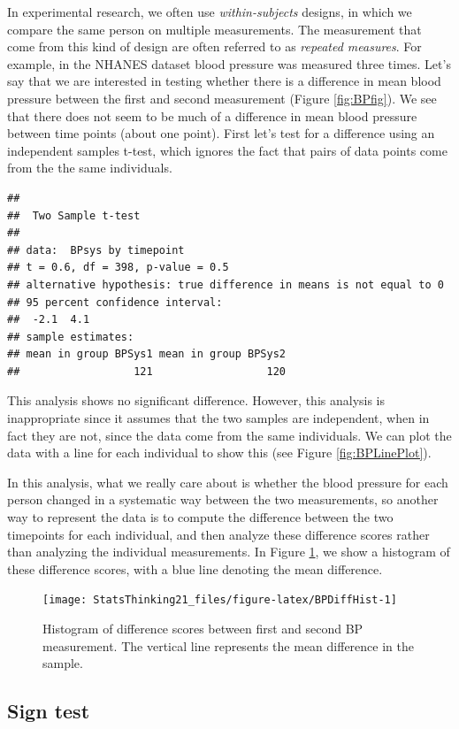 \documentclass[12pt,]{book}
\theoremstyle{definition}
\theoremstyle{definition}
\theoremstyle{definition}
\theoremstyle{remark}
\begin{document}
In experimental research, we often use \emph{within-subjects} designs, in which we compare the same person on multiple measurements. The measurement that come from this kind of design are often referred to as \emph{repeated measures}. For example, in the NHANES dataset blood pressure was measured three times. Let's say that we are interested in testing whether there is a difference in mean blood pressure between the first and second measurement (Figure \ref{fig:BPfig}). We see that there does not seem to be much of a difference in mean blood pressure between time points (about one point). First let's test for a difference using an independent samples t-test, which ignores the fact that pairs of data points come from the the same individuals.

\begin{verbatim}
## 
##  Two Sample t-test
## 
## data:  BPsys by timepoint
## t = 0.6, df = 398, p-value = 0.5
## alternative hypothesis: true difference in means is not equal to 0
## 95 percent confidence interval:
##  -2.1  4.1
## sample estimates:
## mean in group BPSys1 mean in group BPSys2 
##                  121                  120
\end{verbatim}

This analysis shows no significant difference. However, this analysis is inappropriate since it assumes that the two samples are independent, when in fact they are not, since the data come from the same individuals. We can plot the data with a line for each individual to show this (see Figure \ref{fig:BPLinePlot}).

In this analysis, what we really care about is whether the blood pressure for each person changed in a systematic way between the two measurements, so another way to represent the data is to compute the difference between the two timepoints for each individual, and then analyze these difference scores rather than analyzing the individual measurements. In Figure \ref{fig:BPDiffHist}, we show a histogram of these difference scores, with a blue line denoting the mean difference.

\begin{figure}
\texttt{[image: StatsThinking21\_files/figure-latex/BPDiffHist-1]} \caption{Histogram of difference scores between first and second BP measurement. The vertical line represents the mean difference in the sample.}\label{fig:BPDiffHist}
\end{figure}

\hypertarget{sign-test}{%
\subsection{Sign test}\label{sign-test}}
\end{document}
